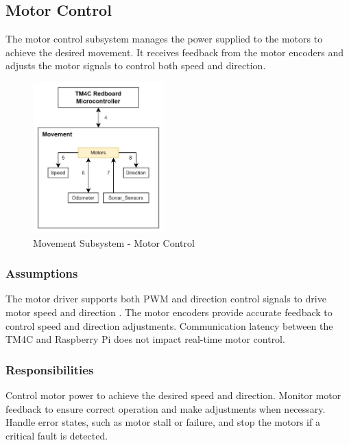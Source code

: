 \newpage


\subsection{Motor Control}
The motor control subsystem manages the power supplied to the motors to achieve the desired movement. It receives feedback from the motor encoders and adjusts the motor signals to control both speed and direction.

\begin{figure}[h!]
	\centering
 	\includegraphics[width=0.45\textwidth]{images/movement/motors.jpg}
 \caption{Movement Subsystem - Motor Control} %
\end{figure}

\subsubsection{Assumptions}
The motor driver supports both PWM and direction control signals to drive motor speed and direction \cite{DimensionEngineeringSabertooth2x25}. The motor encoders provide accurate feedback to control speed and direction adjustments. Communication latency between the TM4C and Raspberry Pi does not impact real-time motor control.

\subsubsection{Responsibilities}
Control motor power to achieve the desired speed and direction. Monitor motor feedback to ensure correct operation and make adjustments when necessary. Handle error states, such as motor stall or failure, and stop the motors if a critical fault is detected.

